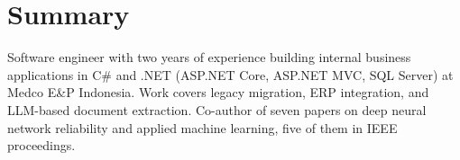 \section{Summary}
\begin{justify}
Software engineer with two years of experience building internal business applications in C\# and .NET (ASP.NET Core, ASP.NET MVC, SQL Server) at Medco E\&P Indonesia. Work covers legacy migration, ERP integration, and LLM-based document extraction. Co-author of seven papers on deep neural network reliability and applied machine learning, five of them in IEEE proceedings.
\end{justify}
